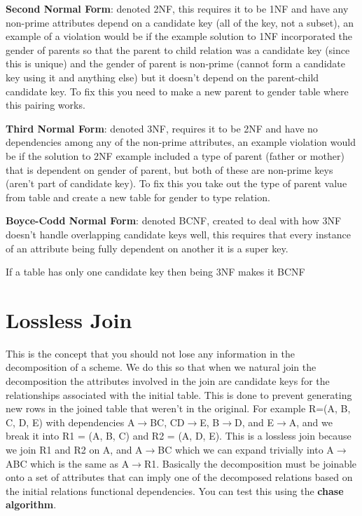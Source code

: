 \documentclass{article}
\begin{document}
\textbf{Second Normal Form}: denoted 2NF, this requires it to be 1NF and have any non-prime attributes depend on a candidate key (all of the key, not a subset), an example of a violation would be if the example solution to 1NF incorporated the gender of parents so that the parent to child relation was a candidate key (since this is unique) and the gender of parent is non-prime (cannot form a candidate key using it and anything else) but it doesn't depend on the parent-child candidate key. To fix this you need to make a new parent to gender table where this pairing works.

\textbf{Third Normal Form}: denoted 3NF, requires it to be 2NF and have no dependencies among any of the non-prime attributes, an example violation would be if the solution to 2NF example included a type of parent (father or mother) that is dependent on gender of parent, but both of these are non-prime keys (aren't part of candidate key). To fix this you take out the type of parent value from table and create a new table for gender to type relation.

\textbf{Boyce-Codd Normal Form}: denoted BCNF, created to deal with how 3NF doesn't handle overlapping candidate keys well, this requires that every instance of an attribute being fully dependent on another it is a super key.

If a table has only one candidate key then being 3NF makes it BCNF


\section*{Lossless Join} %
\label{sec:lossless_join}
This is the concept that you should not lose any information in the decomposition of a scheme. We do this so that when we natural join the decomposition the attributes involved in the join are candidate keys for the relationships associated with the initial table. This is done to prevent generating new rows in the joined table that weren't in the original. For example R=(A, B, C, D, E) with dependencies A$\rightarrow$BC, CD$\rightarrow$E, B$\rightarrow$D, and E$\rightarrow$A, and we break it into R1 = (A, B, C) and R2 = (A, D, E). This is a lossless join because we join R1 and R2 on A, and A$\rightarrow$BC which we can expand trivially into A$\rightarrow$ABC which is the same as A$\rightarrow$R1. Basically the decomposition must be joinable onto a set of attributes that can imply one of the decomposed relations based on the initial relations functional dependencies. You can test this using the \textbf{chase algorithm}.
\end{document}
